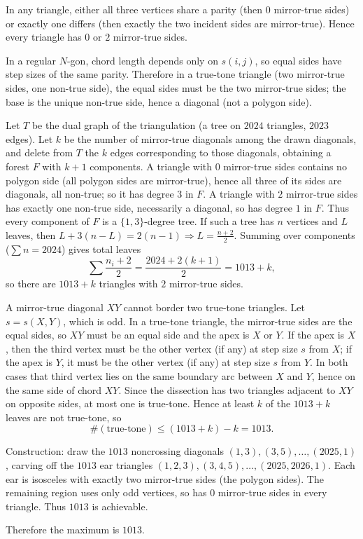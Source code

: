 \smallskip
In any triangle, either all three vertices share a parity (then \(0\) mirror-true sides) or exactly one differs (then exactly the two incident sides are mirror-true). Hence every triangle has \(0\) or \(2\) mirror-true sides.

\smallskip
In a regular \(N\)-gon, chord length depends only on \(s(i,j)\), so equal sides have step sizes of the same parity. Therefore in a true-tone triangle (two mirror-true sides, one non-true side), the equal sides must be the two mirror-true sides; the base is the unique non-true side, hence a diagonal (not a polygon side).

\smallskip
Let \(T\) be the dual graph of the triangulation (a tree on \(2024\) triangles, \(2023\) edges). Let \(k\) be the number of mirror-true diagonals among the drawn diagonals, and delete from \(T\) the \(k\) edges corresponding to those diagonals, obtaining a forest \(F\) with \(k+1\) components.
A triangle with \(0\) mirror-true sides contains no polygon side (all polygon sides are mirror-true), hence all three of its sides are diagonals, all non-true; so it has degree \(3\) in \(F\).
A triangle with \(2\) mirror-true sides has exactly one non-true side, necessarily a diagonal, so has degree \(1\) in \(F\).
Thus every component of \(F\) is a \(\{1,3\}\)-degree tree. If such a tree has \(n\) vertices and \(L\) leaves, then
\(L+3(n-L)=2(n-1)\Rightarrow L=\frac{n+2}{2}\).
Summing over components (\(\sum n=2024\)) gives total leaves
\[
\sum \frac{n_i+2}{2}=\frac{2024+2(k+1)}{2}=1013+k,
\]
so there are \(1013+k\) triangles with \(2\) mirror-true sides.

\smallskip
A mirror-true diagonal \(XY\) cannot border two true-tone triangles. Let \(s=s(X,Y)\), which is odd. In a true-tone triangle, the mirror-true sides are the equal sides, so \(XY\) must be an equal side and the apex is \(X\) or \(Y\). If the apex is \(X\), then the third vertex must be the other vertex (if any) at step size \(s\) from \(X\); if the apex is \(Y\), it must be the other vertex (if any) at step size \(s\) from \(Y\). In both cases that third vertex lies on the same boundary arc between \(X\) and \(Y\), hence on the same side of chord \(XY\). Since the dissection has two triangles adjacent to \(XY\) on opposite sides, at most one is true-tone. Hence at least \(k\) of the \(1013+k\) leaves are not true-tone, so
\[
\#(\text{true-tone})\le (1013+k)-k=1013.
\]

\smallskip
Construction: draw the \(1013\) noncrossing diagonals \((1,3),(3,5),\dots,(2025,1)\), carving off the \(1013\) ear triangles \((1,2,3),(3,4,5),\dots,(2025,2026,1)\).
Each ear is isosceles with exactly two mirror-true sides (the polygon sides). The remaining region uses only odd vertices, so has \(0\) mirror-true sides in every triangle. Thus \(1013\) is achievable.

Therefore the maximum is \(\boxed{1013}\).


\NextPage